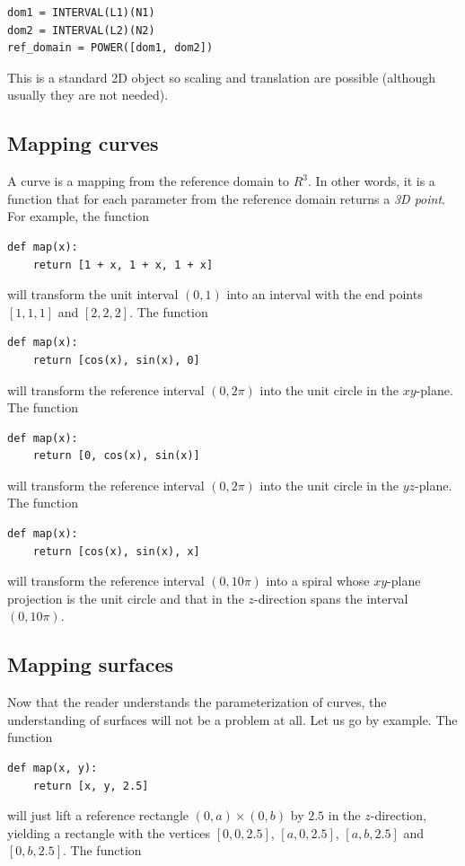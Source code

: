\documentclass{article}
\begin{document}
\begin{verbatim}
dom1 = INTERVAL(L1)(N1)
dom2 = INTERVAL(L2)(N2)
ref_domain = POWER([dom1, dom2])
\end{verbatim}
This is a standard 2D object so scaling and translation are possible (although usually
they are not needed).

\subsection{Mapping curves}

A curve is a mapping from the reference domain to $R^3$. In other words,
it is a function that for each parameter from the reference domain returns a {\em 3D point}.
For example, the function 

\begin{verbatim}
def map(x):
    return [1 + x, 1 + x, 1 + x]
\end{verbatim}
will transform the unit interval $(0, 1)$ into an interval with the end points 
$[1, 1, 1]$ and $[2, 2, 2]$. The function 

\begin{verbatim}
def map(x):
    return [cos(x), sin(x), 0]
\end{verbatim}
will transform the reference interval $(0, 2\pi)$ into the unit circle in the 
$xy$-plane. The function 

\begin{verbatim}
def map(x):
    return [0, cos(x), sin(x)]
\end{verbatim}
will transform the reference interval $(0, 2\pi)$ into the unit circle in the 
$yz$-plane. The function 

\begin{verbatim}
def map(x):
    return [cos(x), sin(x), x]
\end{verbatim}
will transform the reference interval $(0, 10\pi)$ into a spiral whose 
$xy$-plane projection is the unit circle and that in the $z$-direction spans 
the interval $(0, 10\pi)$.

\subsection{Mapping surfaces}

Now that the reader understands the parameterization of curves, the 
understanding of surfaces will not be a problem at all. Let us go by 
example. The function 

\begin{verbatim}
def map(x, y):
    return [x, y, 2.5]
\end{verbatim}
will just lift a reference rectangle $(0, a)\times(0, b)$ by $2.5$ in the $z$-direction,
yielding a rectangle with the vertices $[0, 0, 2.5]$, $[a, 0, 2.5]$,
$[a, b, 2.5]$ and $[0, b, 2.5]$. 
The function 
\end{document}
